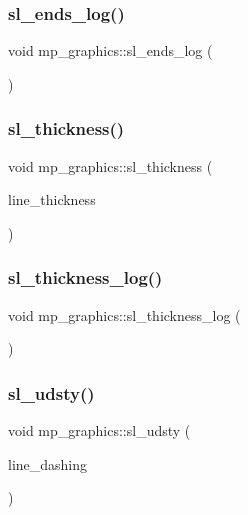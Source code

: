 \subsubsection{\texorpdfstring{sl\+\_\+ends\+\_\+log()}{sl\_ends\_log()}}
{\footnotesize\ttfamily void mp\+\_\+graphics\+::sl\+\_\+ends\+\_\+log (\begin{DoxyParamCaption}{ }\end{DoxyParamCaption})}

\mbox{\label{classmp__graphics_ac409a4e038d93b57dc977ceb3259e850}} 
\subsubsection{\texorpdfstring{sl\+\_\+thickness()}{sl\_thickness()}}
{\footnotesize\ttfamily void mp\+\_\+graphics\+::sl\+\_\+thickness (\begin{DoxyParamCaption}\item[{\mbox{\hyperlink{galois_8h_a09fddde158a3a20bd2dcadb609de11dc}{I\+NT}}}]{line\+\_\+thickness }\end{DoxyParamCaption})}

\mbox{\label{classmp__graphics_a3356cadbf9e1ae81ae353c4014d5590a}} 
\subsubsection{\texorpdfstring{sl\+\_\+thickness\+\_\+log()}{sl\_thickness\_log()}}
{\footnotesize\ttfamily void mp\+\_\+graphics\+::sl\+\_\+thickness\+\_\+log (\begin{DoxyParamCaption}{ }\end{DoxyParamCaption})}

\mbox{\label{classmp__graphics_a66dd75ae04c9254e760ea479ee66946c}} 
\subsubsection{\texorpdfstring{sl\+\_\+udsty()}{sl\_udsty()}}
{\footnotesize\ttfamily void mp\+\_\+graphics\+::sl\+\_\+udsty (\begin{DoxyParamCaption}\item[{\mbox{\hyperlink{galois_8h_a09fddde158a3a20bd2dcadb609de11dc}{I\+NT}}}]{line\+\_\+dashing }\end{DoxyParamCaption})}

